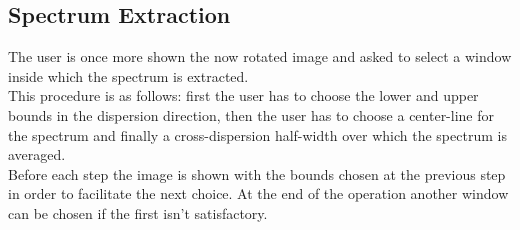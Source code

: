 \documentclass[a4paper]{article}
\begin{document}
\begin{multicols}{2}
		\subsection{Spectrum Extraction}
			The user is once more shown the now rotated image and asked to select a window inside which the spectrum is extracted.\\
			This procedure is as follows: first the user has to choose the lower and upper bounds in the dispersion direction, then the user has to choose a center-line for the spectrum and finally a cross-dispersion half-width over which the spectrum is averaged.\\
			Before each step the image is shown with the bounds chosen at the previous step in order to facilitate the next choice. At the end of the operation another window can be chosen if the first isn't satisfactory.\\
			

\end{multicols}
\end{document}
